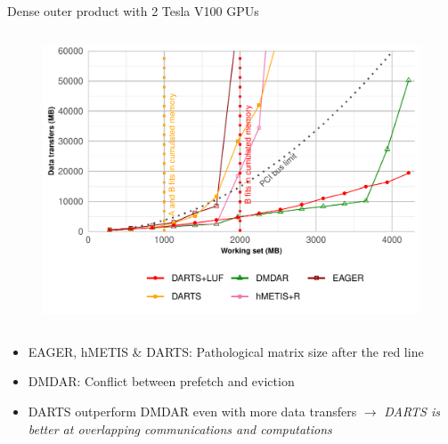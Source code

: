 \documentclass{libs/ufc_format}
\begin{document}
\begin{frame}{Dense outer product with 2 Tesla V100 GPUs}
\begin{columns}{}
        \begin{column}{0.5\textwidth}
	\begin{figure}
		\includegraphics[scale = 0.3]{Images/DT_dynamic_data_aware_no_hfp_gemini-2-ipdps_2GPU.pdf}
	\end{figure}
		\end{column}
		\end{columns}
	\begin{itemize}
		\item EAGER, hMETIS \& DARTS: Pathological matrix size after the red line
		\item DMDAR: Conflict between prefetch and eviction
		 \item DARTS outperform DMDAR even with more data transfers $\rightarrow$ \emph{DARTS is better at 
		overlapping communications and computations}
	\end{itemize}
\end{frame}
\end{document}
